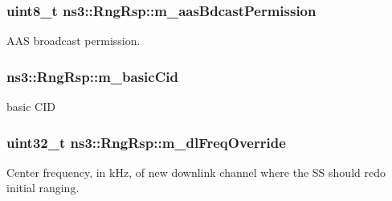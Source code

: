 \subsubsection[{\texorpdfstring{m\+\_\+aas\+Bdcast\+Permission}{m_aasBdcastPermission}}]{\setlength{\rightskip}{0pt plus 5cm}uint8\+\_\+t ns3\+::\+Rng\+Rsp\+::m\+\_\+aas\+Bdcast\+Permission\hspace{0.3cm}{\ttfamily [private]}}\hypertarget{classns3_1_1RngRsp_a36340a5031cbd3710c642f34d01ac634}{}\label{classns3_1_1RngRsp_a36340a5031cbd3710c642f34d01ac634}


A\+AS broadcast permission. 

\subsubsection[{\texorpdfstring{m\+\_\+basic\+Cid}{m_basicCid}}]{ ns3\+::\+Rng\+Rsp\+::m\+\_\+basic\+Cid\hspace{0.3cm}{\ttfamily [private]}}\hypertarget{classns3_1_1RngRsp_acc67a4d993abc670d76279b031ff6103}{}\label{classns3_1_1RngRsp_acc67a4d993abc670d76279b031ff6103}


basic C\+ID 

\subsubsection[{\texorpdfstring{m\+\_\+dl\+Freq\+Override}{m_dlFreqOverride}}]{\setlength{\rightskip}{0pt plus 5cm}uint32\+\_\+t ns3\+::\+Rng\+Rsp\+::m\+\_\+dl\+Freq\+Override\hspace{0.3cm}{\ttfamily [private]}}\hypertarget{classns3_1_1RngRsp_a542bcf2ebe6f5241700fcbeeb3b63fe3}{}\label{classns3_1_1RngRsp_a542bcf2ebe6f5241700fcbeeb3b63fe3}


Center frequency, in k\+Hz, of new downlink channel where the SS should redo initial ranging. 

